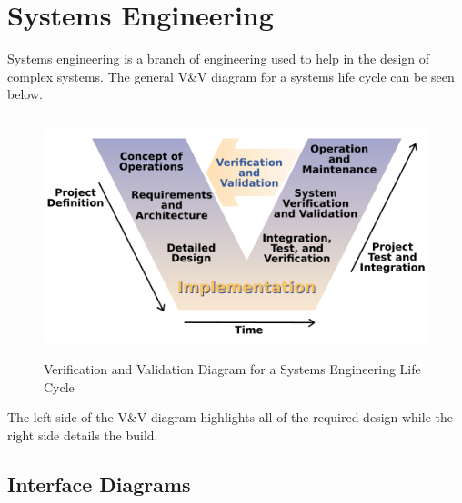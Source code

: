 \section{Systems Engineering}

Systems engineering is a branch of engineering used to help in the
design of complex systems. The general V\&V diagram for a systems life
cycle can be seen below.
\begin{figure}[H]
  \begin{center}
  \includegraphics[height=70mm]{Figures/VandV}
  \end{center}
  \caption{Verification and Validation Diagram for a Systems
    Engineering Life Cycle \cite{vandv}}
\end{figure}
The left side of the V\&V diagram highlights all of the required
design while the right side details the build. 

\subsection{Interface Diagrams} 

